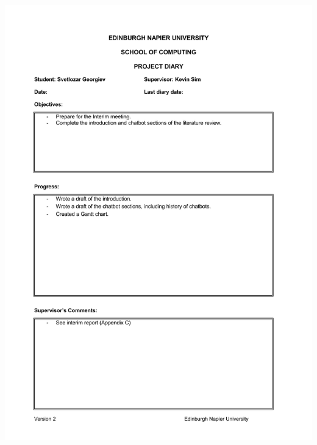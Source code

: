 \documentclass[12pt,a4paper]{article}
\begin{document}
\begin{appendices}
\includegraphics[width=\textwidth,height=\textheight,keepaspectratio]{week9.jpg}
\newpage

\end{appendices}
\end{document}
